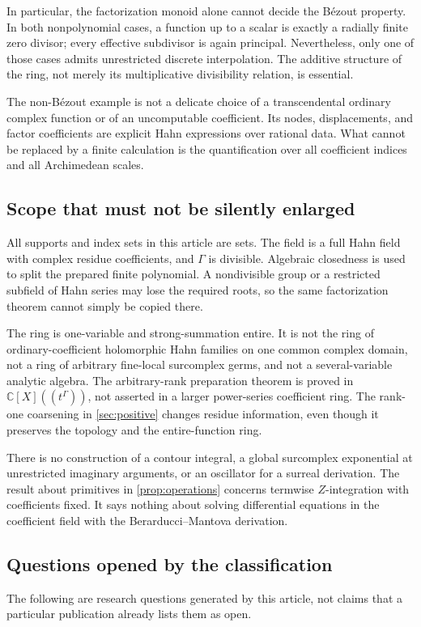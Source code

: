 \documentclass[11pt]{article}
\theoremstyle{plain}
\theoremstyle{plain}
\theoremstyle{plain}
\theoremstyle{definition}
\theoremstyle{definition}
\theoremstyle{definition}
\theoremstyle{remark}
\newcommand{\C}{\mathbb C}\newcommand{\R}{\mathbb R}
\begin{document}
In particular, the factorization monoid alone cannot decide the
B\'ezout property. In both nonpolynomial cases, a function up to a
scalar is exactly a radially finite zero divisor; every effective
subdivisor is again principal. Nevertheless, only one of those
cases admits unrestricted discrete interpolation. The additive
structure of the ring, not merely its multiplicative divisibility
relation, is essential.

The non-B\'ezout example is not a delicate choice of a transcendental
ordinary complex function or of an uncomputable coefficient. Its
nodes, displacements, and factor coefficients are explicit Hahn
expressions over rational data. What cannot be replaced by a finite
calculation is the quantification over all coefficient indices and
all Archimedean scales.

\subsection{Scope that must not be silently enlarged}
All supports and index sets in this article are sets. The field is a
full Hahn field with complex residue coefficients, and $\Gamma$ is
divisible. Algebraic closedness is used to split the prepared finite
polynomial. A nondivisible group or a restricted subfield of Hahn
series may lose the required roots, so the same factorization theorem
cannot simply be copied there.

The ring is one-variable and strong-summation entire. It is not the
ring of ordinary-coefficient holomorphic Hahn families on one common
complex domain, not a ring of arbitrary fine-local surcomplex germs,
and not a several-variable analytic algebra. The arbitrary-rank
preparation theorem is proved in $\C[X]((t^\Gamma))$, not asserted in
a larger power-series coefficient ring. The rank-one coarsening in
\cref{sec:positive} changes residue information, even though it preserves
the topology and the entire-function ring.

There is no construction of a contour integral, a global surcomplex
exponential at unrestricted imaginary arguments, or an oscillator for
a surreal derivation. The result about primitives in
\cref{prop:operations} concerns termwise $Z$-integration with
coefficients fixed. It says nothing about solving differential
equations in the coefficient field with the Berarducci--Mantova
derivation.

\subsection{Questions opened by the classification}
The following are research questions generated by this article, not
claims that a particular publication already lists them as open.
\end{document}
